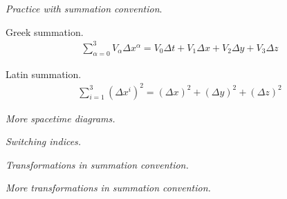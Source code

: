 \documentclass{report}
\begin{document}
\begin{subquests}
\begin{subquests}
		\item

		\item

		\item

		\item

		\item

		\item

		\item

		\item

		\item

		\item
	\end{subquests}

	\item \emph{Practice with summation convention}.
	\begin{subquests}
		\item Greek summation.
		\begin{gather*}
			\sum_{\alpha=0}^{3} V_{\alpha}\Delta{x^\alpha} = V_{0}\Delta{t} + V_{1}\Delta{x} + V_{2}\Delta{y} + V_{3}\Delta{z}
		\end{gather*}

		\item Latin summation.
		\begin{gather*}
			\sum_{i=1}^{3} (\Delta{x^i})^2 = (\Delta{x})^2 + (\Delta{y})^2 + (\Delta{z})^2
		\end{gather*}
	\end{subquests}

	\item \emph{More spacetime diagrams.}
	\begin{subquests}
		\item

		\item

		\item

		\item
	\end{subquests}

	\item \emph{Switching indices.}

	\item \emph{Transformations in summation convention.}

	\item \emph{More transformations in summation convention.}
	\begin{subquests}
		\item


\end{subquests}
\end{subquests}
\end{document}
